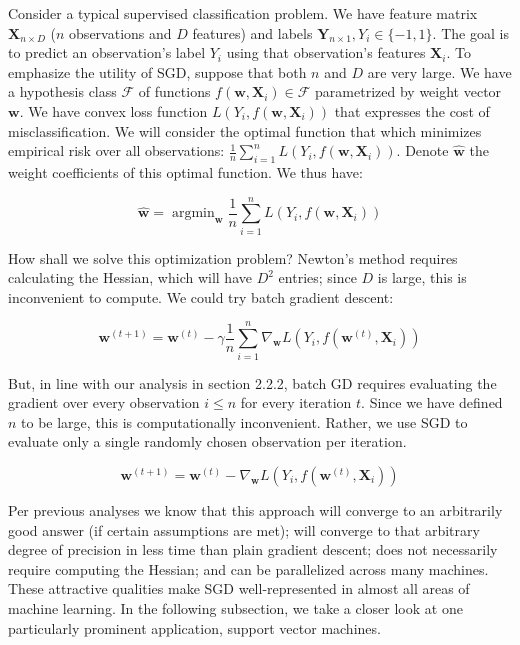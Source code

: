 \documentclass{article}
\DeclareMathOperator*{\argmin}{argmin}
\begin{document}
Consider a typical supervised classification problem. We have
feature matrix $\bm{X}_{n \times D}$ ($n$ observations and $D$
features) and labels $\bm{Y}_{n \times 1}, Y_i \in \{-1, 1\}$. The goal is to
predict an observation's label $Y_i$ using that observation's features
$\bm{X}_i$. To emphasize the utility of SGD, suppose that both $n$ and $D$ are
very large.
We have a hypothesis class $\mathcal{F}$ of functions $f(\bm{w}, \bm{X}_i) \in \mathcal{F}$ parametrized by weight
vector $\bm{w}$. We have convex loss function $L(Y_i, f(\bm{w}, \bm{X}_i))$ that
expresses the cost of misclassification. 
We will consider the optimal function
that which minimizes empirical risk over all observations: $\frac{1}{n}
\sum_{i=1}^n L(Y_i, f(\bm{w}, \bm{X}_i))$.
Denote $\hat{\bm{w}}$ the weight coefficients of this optimal function. We thus
have:

\begin{equation}
	\hat{\bm{w}} = \argmin_{\bm{w}}\frac{1}{n} \sum_{i=1}^n L(Y_i, f(\bm{w}, \bm{X}_i))
\end{equation}

How shall we solve this optimization problem? Newton's method requires
calculating the Hessian, which will have $D^2$ entries; since $D$ is large,
this is inconvenient to compute. We could try batch gradient descent:

\begin{equation}
	\bm{w}^{(t+1)} = \bm{w}^{(t)} - \gamma \frac{1}{n}\sum_{i=1}^n
	\nabla_{\bm{w}} L(Y_i, f(\bm{w}^{(t)}, \bm{X}_i))
\end{equation}

But, in line with our analysis in section 2.2.2, batch GD requires evaluating
the gradient over every observation $i \leq n$ for every iteration $t$. Since we have defined $n$ to be
large, this is computationally inconvenient. Rather, we use SGD to evaluate only
a single randomly chosen observation per iteration.

\begin{equation}
	\bm{w}^{(t+1)} = \bm{w}^{(t)} - \nabla_{\bm{w}} L(Y_i, f(\bm{w}^{(t)}, \bm{X}_i))
\end{equation}

Per previous analyses we know that this approach will converge to an arbitrarily
good answer (if certain assumptions are met); will converge to that arbitrary
degree of precision in less time than plain gradient descent; does not
necessarily require computing the Hessian; and can be parallelized across many
machines. These attractive qualities make SGD well-represented in almost all areas of
machine learning. In the following subsection, we take a closer look at one
particularly prominent application, support vector machines.
\end{document}
